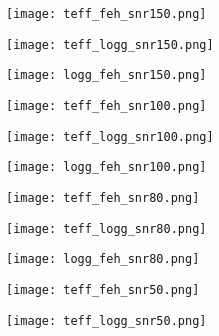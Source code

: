 \documentclass[fleqn,usenatbib]{mnras}
\begin{document}
\begin{figure*}%
 \centering
 \begin{minipage}{0.33\textwidth}
  \texttt{[image: teff\_feh\_snr150.png]} 
 \end{minipage}
 \begin{minipage}{0.33\textwidth}
  \texttt{[image: teff\_logg\_snr150.png]} 
 \end{minipage}
 \begin{minipage}{0.33\textwidth}
  \texttt{[image: logg\_feh\_snr150.png]} 
 \end{minipage}
 \centering
 \begin{minipage}{0.33\textwidth}
  \texttt{[image: teff\_feh\_snr100.png]} 
 \end{minipage}
 \begin{minipage}{0.33\textwidth}
  \texttt{[image: teff\_logg\_snr100.png]} 
 \end{minipage}
 \begin{minipage}{0.33\textwidth}
  \texttt{[image: logg\_feh\_snr100.png]} 
 \end{minipage}
 \centering
 \begin{minipage}{0.33\textwidth}
  \texttt{[image: teff\_feh\_snr80.png]} 
 \end{minipage}
 \begin{minipage}{0.33\textwidth}
  \texttt{[image: teff\_logg\_snr80.png]} 
 \end{minipage}
 \begin{minipage}{0.33\textwidth}
  \texttt{[image: logg\_feh\_snr80.png]} 
 \end{minipage}
 \centering
 \begin{minipage}{0.33\textwidth}
  \texttt{[image: teff\_feh\_snr50.png]} 
 \end{minipage}
 \begin{minipage}{0.33\textwidth}
  \texttt{[image: teff\_logg\_snr50.png]} 

\end{minipage}
\end{figure*}
\end{document}
